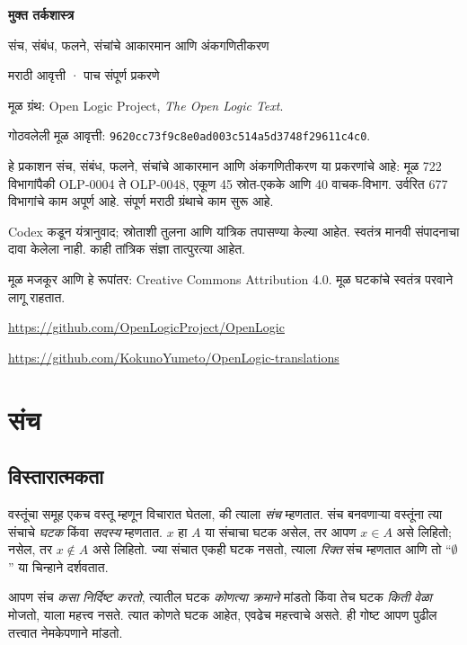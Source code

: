 \documentclass[11pt,a4paper,openany]{book}
\theoremstyle{definition}
\newenvironment{explain}{}{}
\begin{document}
\begin{titlepage}
\vspace*{2cm}
{\Huge\bfseries मुक्त तर्कशास्त्र\par}
\vspace{1cm}
{\LARGE संच, संबंध, फलने, संचांचे आकारमान आणि अंकगणितीकरण\par}
\vspace{1cm}
{\large मराठी आवृत्ती · पाच संपूर्ण प्रकरणे\par}
\vfill
मूळ ग्रंथ: Open Logic Project, \textit{The Open Logic Text}.\par
गोठवलेली मूळ आवृत्ती: \texttt{9620cc73f9c8e0ad003c514a5d3748f29611c4c0}.\par
हे प्रकाशन संच, संबंध, फलने, संचांचे आकारमान आणि अंकगणितीकरण या प्रकरणांचे आहे: मूळ 722 विभागांपैकी OLP-0004 ते OLP-0048, एकूण 45 स्रोत-एकके आणि 40 वाचक-विभाग. उर्वरित 677 विभागांचे काम अपूर्ण आहे.
संपूर्ण मराठी ग्रंथाचे काम सुरू आहे.\par
Codex कडून यंत्रानुवाद; स्रोताशी तुलना आणि यांत्रिक तपासण्या केल्या आहेत.
स्वतंत्र मानवी संपादनाचा दावा केलेला नाही. काही तांत्रिक संज्ञा तात्पुरत्या आहेत.\par
मूळ मजकूर आणि हे रूपांतर: Creative Commons Attribution 4.0.
मूळ घटकांचे स्वतंत्र परवाने लागू राहतात.\par
\url{https://github.com/OpenLogicProject/OpenLogic}\par
\url{https://github.com/KokunoYumeto/OpenLogic-translations}
\end{titlepage}
\tableofcontents
\chapter{संच}








\section{विस्तारात्मकता}\label{sfr:set:bas:sec}

वस्तूंचा समूह एकच वस्तू {म्हणून} विचारात घेतला, की त्याला \emph{संच} म्हणतात.
संच बनवणाऱ्या वस्तूंना त्या संचाचे \emph{घटक} किंवा \emph{सदस्य} म्हणतात.
$x$ हा $A$ या संचाचा घटक असेल, तर आपण $x \in A$ असे लिहितो;
नसेल, तर $x \notin A$ असे लिहितो. ज्या संचात एकही घटक नसतो,
त्याला \emph{रिक्त} संच म्हणतात आणि तो ``$\emptyset$'' या चिन्हाने दर्शवतात.

\begin{explain}
आपण संच \emph{कसा निर्दिष्ट करतो}, त्यातील घटक \emph{कोणत्या क्रमाने}
मांडतो किंवा तेच घटक \emph{किती वेळा} मोजतो, याला महत्त्व नसते.
त्यात कोणते घटक आहेत, एवढेच महत्त्वाचे असते. ही गोष्ट आपण पुढील
तत्त्वात नेमकेपणाने मांडतो.
\end{explain}
\end{document}
